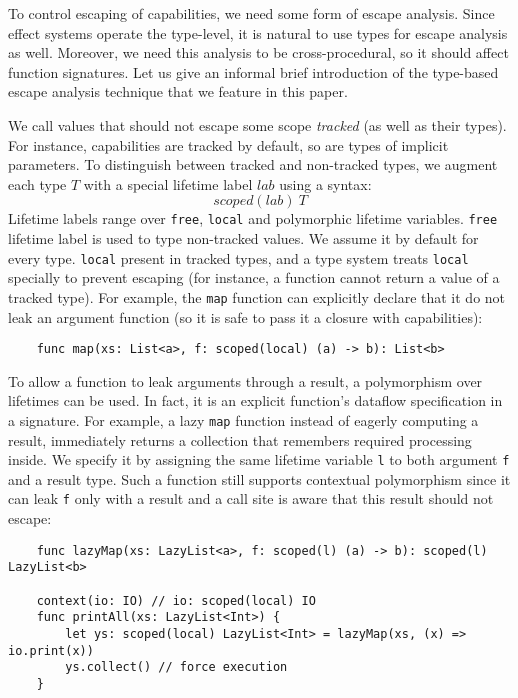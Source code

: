 \documentclass[acmsmall]{acmart}
\newcommand{\ap}{~}
\begin{document}
To control escaping of capabilities, we need some form of escape analysis. %
Since effect systems operate the type-level, it is natural to use types for escape analysis as well.
Moreover, we need this analysis to be cross-procedural, so it should affect function signatures.
Let us give an informal brief introduction of the type-based escape analysis technique that we feature in this paper.

We call values that should not escape some scope \textit{tracked} (as well as their types).
For instance, capabilities are tracked by default, so are types of implicit parameters.
To distinguish between tracked and non-tracked types, we augment each type $T$ with a special lifetime label $lab$ using a syntax: \[scoped(lab)\ap T\]
Lifetime labels range over \texttt{free}, \texttt{local} and polymorphic lifetime variables.
\texttt{free} lifetime label is used to type non-tracked values.
We assume it by default for every type.
\texttt{local} present in tracked types, and a type system treats \texttt{local} specially to prevent escaping (for instance, a function cannot return a value of a tracked type).
For example, the \texttt{map} function can explicitly declare that it do not leak an argument function (so it is safe to pass it a closure with capabilities):
\begin{verbatim}
    func map(xs: List<a>, f: scoped(local) (a) -> b): List<b>
\end{verbatim}

To allow a function to leak arguments through a result, a polymorphism over lifetimes can be used.
In fact, it is an explicit function's dataflow specification in a signature. %
For example, a lazy \texttt{map} function instead of eagerly computing a result, immediately returns a collection that remembers required processing inside.
We specify it by assigning the same lifetime variable \texttt{l} to both argument \texttt{f} and a result type.
Such a function still supports contextual polymorphism since it can leak \texttt{f} only with a result and a call site is aware that this result should not escape:
\begin{verbatim}
    func lazyMap(xs: LazyList<a>, f: scoped(l) (a) -> b): scoped(l) LazyList<b>

    context(io: IO) // io: scoped(local) IO
    func printAll(xs: LazyList<Int>) {
        let ys: scoped(local) LazyList<Int> = lazyMap(xs, (x) => io.print(x))
        ys.collect() // force execution
    }
\end{verbatim}
\end{document}
